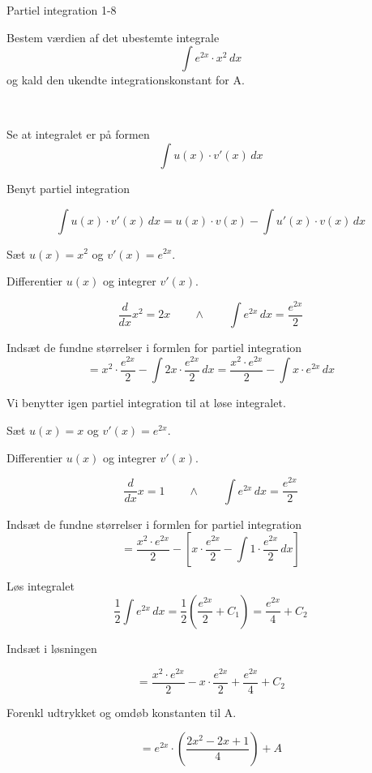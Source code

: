 \documentclass{article}
\begin{document}
\begin{exercise}{Partiel integration 1-8}
	
	
	Bestem værdien af det ubestemte integrale
	\[
	\int e^{2x} \cdot x^2 \, dx
	\]
	og kald den ukendte integrationskonstant for A.
	
	 \\
	
	
	\hint
	
	Se at integralet er på formen
	\[
	\int u(x) \cdot v'(x) \, dx
	\]
	
	\hint
	
	Benyt partiel integration
	
	\hint
	\[
	\int u(x) \cdot v'(x)\, dx = u(x) \cdot v(x) - \int u'(x) \cdot v(x) \, dx
	\]
	\hint
	
	Sæt $u(x) = x^2$ og $v'(x) = e^{2x}$.
	
	
	\hint
	
	Differentier $u(x)$ og integrer $v'(x)$.
	
	\hint
	\[
	\frac{d}{dx}x^2 = 2x \qquad \wedge \qquad \int e^{2x} \, dx = \frac{e^{2x}}{2}
	\]
	
	\hint
	
	Indsæt de fundne størrelser i formlen for partiel integration
	\[
	= x^2 \cdot  \frac{e^{2x}}{2} - \int 2x \cdot  \frac{e^{2x}}{2} \, dx = \frac{x^2 \cdot e^{2x}}{2} - \int x \cdot e^{2x} \, dx 
	\]
	
	\hint
	
	Vi benytter igen partiel integration til at løse integralet.
	
	\hint
	
	Sæt $u(x) = x$ og $v'(x) = e^{2x}$.
	
	
	\hint
	
	Differentier $u(x)$ og integrer $v'(x)$.
	
	\hint
	\[
	\frac{d}{dx}x = 1 \qquad \wedge \qquad \int e^{2x} \, dx = \frac{e^{2x}}{2}
	\]
	
	\hint
	
	Indsæt de fundne størrelser i formlen for partiel integration
	\[
	= \frac{x^2 \cdot e^{2x}}{2} - \left[ x \cdot \frac{e^{2x}}{2} - \int 1 \cdot \frac{e^{2x}}{2} \, dx \right]
	\]
	
	\hint
	Løs integralet
	\[
	\frac{1}{2} \int e^{2x} \, dx = \frac{1}{2} \left(\frac{e^{2x}}{2} + C_1\right) = \frac{e^{2x}}{4} + C_2
	\]
	
	\hint
	Indsæt i løsningen 
	
	\hint
	
	\[
	= \frac{x^2 \cdot e^{2x}}{2} -x \cdot \frac{e^{2x}}{2} + \frac{e^{2x}}{4} + C_2
	\]
	
	\hint
	
	Forenkl udtrykket og omdøb konstanten til A.
	
	\hint
	
	\[
	=  e^{2x} \cdot \left( \frac{2x^2-2x+1}{4}  \right) + A
	\]
	
	
\end{exercise}
\end{document}
